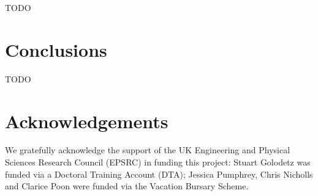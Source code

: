 \documentclass[preprint,a4paper]{elsarticle}
\begin{document}
TODO

\section{Conclusions}

TODO

\section{Acknowledgements}
\label{sec:acknowledgements}

We gratefully acknowledge the support of the UK Engineering and Physical Sciences Research Council (EPSRC) in funding this project: Stuart Golodetz was funded via a Doctoral Training Account (DTA); Jessica Pumphrey, Chris Nicholls and Clarice Poon were funded via the Vacation Bursary Scheme.



\end{document}
